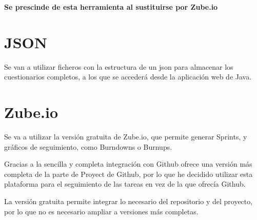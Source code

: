 \textbf{Se prescinde de esta herramienta al sustituirse por Zube.io}

\section{JSON}

Se van a utilizar ficheros con la estructura de un json para almacenar los cuestionarios completos, a los que se accederá desde la aplicación web de Java.

\section{Zube.io}

Se va a utilizar la versión gratuita de Zube.io, que permite generar Sprints, y gráficos de seguimiento, como Burndowns o Burnups.

Gracias a la sencilla y completa integración con Github ofrece una versión más completa de la parte de Proyect de Github, por lo que he decidido utilizar esta plataforma para el seguimiento de las tareas en vez de la que ofrecía Github.

La versión gratuita permite integrar lo necesario del repositorio y del proyecto, por lo que no es necesario ampliar a versiones más completas.







